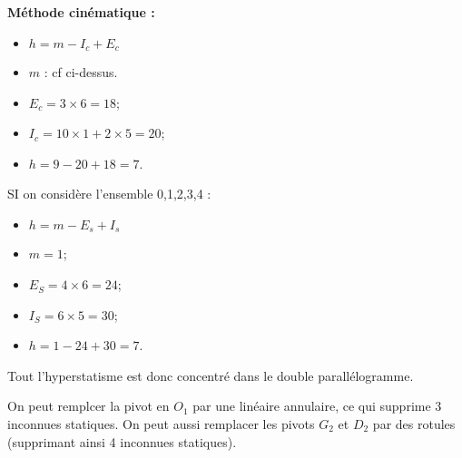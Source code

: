 \textbf{Méthode cinématique :}
\begin{itemize}
\item $h = m -I_c + E_c$ 
\item $m$ : cf ci-dessus. 
\item $E_c =3\times 6 = 18$;
\item $I_c = 10\times 1 + 2 \times 5 = 20$;
\item $h = 9 - 20 + 18 = 7$.
\end{itemize}


\else
\fi

\ifprof
SI on considère l'ensemble 0,1,2,3,4 : 
\begin{itemize}
\item $h = m -E_s + I_s$ 
\item $m = 1$; 
\item $E_S =4\times 6 = 24$;
\item $I_S = 6\times 5  = 30$;
\item $h = 1 -24 + 30 = 7$. 
\end{itemize}
Tout l'hyperstatisme est donc concentré dans le double parallélogramme. 

On peut remplcer la pivot en $O_1$ par une linéaire annulaire, ce qui supprime 3 inconnues statiques. 
On peut aussi remplacer les pivots $G_2$ et $D_2$ par des rotules (supprimant ainsi 4 inconnues statiques).
\else
\fi
 

\ifprof
\else
\ifcolle\else
{}

\fi
\fi